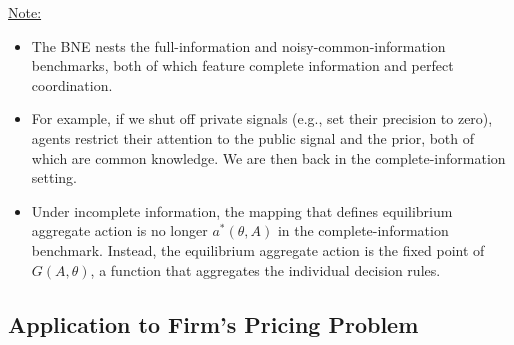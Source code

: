 \documentclass[12pt]{article}
\begin{document}
\underline{Note:}
\begin{itemize}
	\item The BNE nests the full-information and noisy-common-information benchmarks, both of which feature complete information and perfect coordination. 
	\item For example, if we shut off private signals (e.g., set their precision to zero), agents restrict their attention to the public signal and the prior, both of which are common knowledge. We are then back in the complete-information setting. 
	\item Under incomplete information, the mapping that defines equilibrium aggregate action is no longer $a^*(\theta, A)$ in the complete-information benchmark. Instead, the equilibrium aggregate action is the fixed point of $G(A, \theta)$, a function that aggregates the individual decision rules.
\end{itemize}

%
%
%
%

\subsection{Application to Firm's Pricing Problem}
\end{document}
